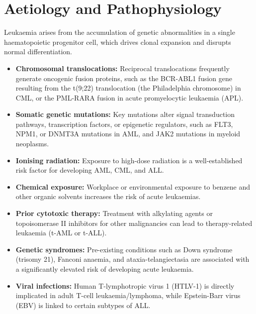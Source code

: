 \section*{Aetiology and Pathophysiology}
Leukaemia arises from the accumulation of genetic abnormalities in a single haematopoietic progenitor cell, which drives clonal expansion and disrupts normal differentiation.
\begin{itemize}
    \item \textbf{Chromosomal translocations:} Reciprocal translocations frequently generate oncogenic fusion proteins, such as the BCR-ABL1 fusion gene resulting from the t(9;22) translocation (the Philadelphia chromosome) in CML, or the PML-RARA fusion in acute promyelocytic leukaemia (APL).
    \item \textbf{Somatic genetic mutations:} Key mutations alter signal transduction pathways, transcription factors, or epigenetic regulators, such as FLT3, NPM1, or DNMT3A mutations in AML, and JAK2 mutations in myeloid neoplasms.
    \item \textbf{Ionising radiation:} Exposure to high-dose radiation is a well-established risk factor for developing AML, CML, and ALL.
    \item \textbf{Chemical exposure:} Workplace or environmental exposure to benzene and other organic solvents increases the risk of acute leukaemias.
    \item \textbf{Prior cytotoxic therapy:} Treatment with alkylating agents or topoisomerase II inhibitors for other malignancies can lead to therapy-related leukaemia (t-AML or t-ALL).
    \item \textbf{Genetic syndromes:} Pre-existing conditions such as Down syndrome (trisomy 21), Fanconi anaemia, and ataxia-telangiectasia are associated with a significantly elevated risk of developing acute leukaemia.
    \item \textbf{Viral infections:} Human T-lymphotropic virus 1 (HTLV-1) is directly implicated in adult T-cell leukaemia/lymphoma, while Epstein-Barr virus (EBV) is linked to certain subtypes of ALL.
\end{itemize}

